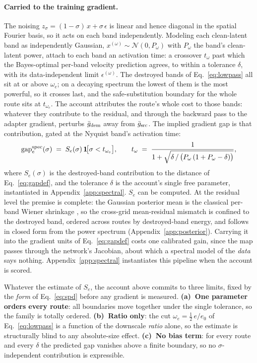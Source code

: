 \paragraph{Carried to the training gradient.}
The noising $z_\sigma = (1-\sigma)\,x + \sigma\,\epsilon$ is linear
and hence diagonal in the spatial Fourier basis, so it acts on each
band independently. Modeling each clean-latent band as independently
Gaussian, $x^{(\omega)} \sim \mathcal{N}(0, P_\omega)$ with
$P_\omega$ the band's clean-latent power, \citet{xiao2026spd} attach
to each band an activation time: a crossover $t_\omega$ past which
the Bayes-optimal per-band velocity prediction agrees, to within a
tolerance $\delta$, with its data-independent limit
$\epsilon^{(\omega)}$.
The destroyed bands of Eq.~\ref{eq:lowpass} all sit at or above
$\omega_e$; on a decaying spectrum the lowest of them is the most
powerful, so it crosses last, and the safe-substitution boundary for
the whole route sits at $t_{\omega_e}$. The account attributes the
route's whole cost to those bands: whatever they contribute to the
residual, and through the backward pass to the adapter gradient,
perturbs $\bar g_{\mathrm{dem}}$ away from $\bar g_{\mathrm{src}}$. The implied
gradient gap is that contribution, gated at the Nyquist band's
activation time:
\begin{equation}
\mathrm{gap}_e^{\mathrm{spec}}(\sigma) \;=\;
S_e(\sigma)\,\mathbf{1}\!\big[\sigma < t_{\omega_e}\big],
\qquad
t_\omega \;=\;
\frac{1}{1 + \sqrt{\delta \,/\, \big(P_\omega\,(1 + P_\omega -
\delta)\big)}},
\label{eq:spd}
\end{equation}
where $S_e(\sigma)$ is the destroyed-band contribution to the distance
of Eq.~\ref{eq:gapdef}, and the tolerance $\delta$ is the account's
single free parameter, instantiated in Appendix~\ref{app:spectral}.
$S_e$ can be computed. At the residual level
the premise is complete: the Gaussian posterior mean is the classical
per-band Wiener shrinkage \citep{wiener1949}, so the cross-grid
mean-residual mismatch is confined to the destroyed band, ordered
across routes by destroyed-band energy, and follows in closed form
from the power spectrum (Appendix~\ref{app:posterior}). Carrying it
into the gradient units of Eq.~\ref{eq:gapdef} costs one calibrated
gain, since the map passes through the network's Jacobian, about which
a spectral model of the \emph{data} says nothing.
Appendix~\ref{app:spectral} instantiates this pipeline when
the account is scored.

Whatever the estimate of $S_e$, the account above commits to three
limits, fixed by the \emph{form} of Eq.~\ref{eq:spd} before any
gradient is measured.
\textbf{(a)~One parameter orders every route}: all boundaries move
together under the single tolerance, so the family is totally ordered.
\textbf{(b)~Ratio only}: the cut $\omega_e = \tfrac{1}{2}\,e/e_0$ of
Eq.~\ref{eq:lowpass} is a function of the downscale \emph{ratio} alone,
so the estimate is structurally blind to any absolute-size effect.
\textbf{(c)~No bias term}: for every route and every $\delta$
the predicted gap vanishes above a finite boundary, so no
$\sigma$-independent contribution is expressible.

